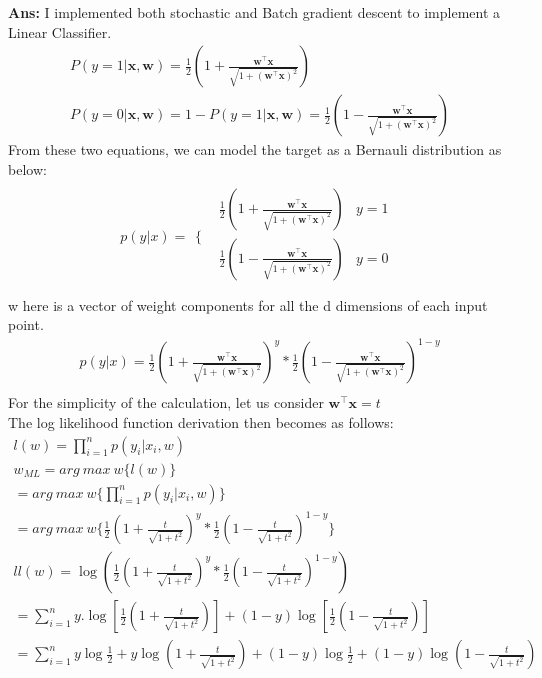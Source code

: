 \documentclass[11pt]{article}
\begin{document}
\textbf{Ans:} I implemented both stochastic and Batch gradient descent 
to implement a Linear Classifier.\\
\begin{align*}
P(y=1|\mathbf{x},\mathbf{w})=\frac{1}{2} \left(1+\frac{\mathbf{w}^\top \mathbf{x}}{\sqrt{1+(\mathbf{w}^\top \mathbf{x})^2}} \right)\\
P(y=0|\mathbf{x},\mathbf{w})=1-P(y=1|\mathbf{x},\mathbf{w})
=\frac{1}{2} \left(1-\frac{\mathbf{w}^\top \mathbf{x}}{\sqrt{1+(\mathbf{w}^\top \mathbf{x})^2}} \right)
\end{align*}
From these two equations, we can model the target as a Bernauli distribution as below:\\
\begin{align*}
p(y|x)=
\begin{array}{cc}
  \{& 
    \begin{array}{cc}
       \frac{1}{2} \left(1+\frac{\mathbf{w}^\top \mathbf{x}}{\sqrt{1+(\mathbf{w}^\top \mathbf{x})^2}} \right)& y=1\\
       \frac{1}{2} \left(1-\frac{\mathbf{w}^\top \mathbf{x}}{\sqrt{1+(\mathbf{w}^\top \mathbf{x})^2}} \right)& y=0 \\
    \end{array}
\end{array}
\end{align*}
w here is a vector of weight components for all the d dimensions of each input point.\\
\begin{align*}
p(y|x)=\frac{1}{2} \left(1+\frac{\mathbf{w}^\top \mathbf{x}}{\sqrt{1+(\mathbf{w}^\top \mathbf{x})^2}}\right)^{y} * \frac{1}{2} \left(1-\frac{\mathbf{w}^\top \mathbf{x}}{\sqrt{1+(\mathbf{w}^\top \mathbf{x})^2}}\right)^{1-y}\\
\end{align*}
For the simplicity of the calculation, let us consider $\mathbf{w}^\top \mathbf{x}=t$\\
The log likelihood function derivation then becomes as follows:\\
\begin{align*}
l(w)=\prod_{i=1}^np(y_i|x_i,w)\\
w_{ML}=arg\ max\ w\{l(w)\}\\
=arg\ max\ w\{\prod_{i=1}^np(y_i|x_i,w)\}\\
=arg\ max\ w\{\frac{1}{2} \left(1+\frac{t}{\sqrt{1+t^2}}\right)^{y} * \frac{1}{2} \left(1-\frac{t}{\sqrt{1+t^2}}\right)^{1-y}\}\\
ll(w)=\log(\frac{1}{2} \left(1+\frac{t}{\sqrt{1+t^2}}\right)^{y} * \frac{1}{2} \left(1-\frac{t}{\sqrt{1+t^2}}\right)^{1-y})\\
=\sum_{i=1}^n y.\log[\frac{1}{2}\left(1+\frac{t}{\sqrt{1+t^2}}\right)]+ (1-y)\log[\frac{1}{2}\left(1-\frac{t}{\sqrt{1+t^2}}\right)]\\
=\sum_{i=1}^n y\log\frac{1}{2}+y\log\left(1+\frac{t}{\sqrt{1+t^2}}\right)+(1-y)\log\frac{1}{2} + (1-y)\log\left(1-\frac{t}{\sqrt{1+t^2}}\right)\\
\end{align*}
\end{document}
